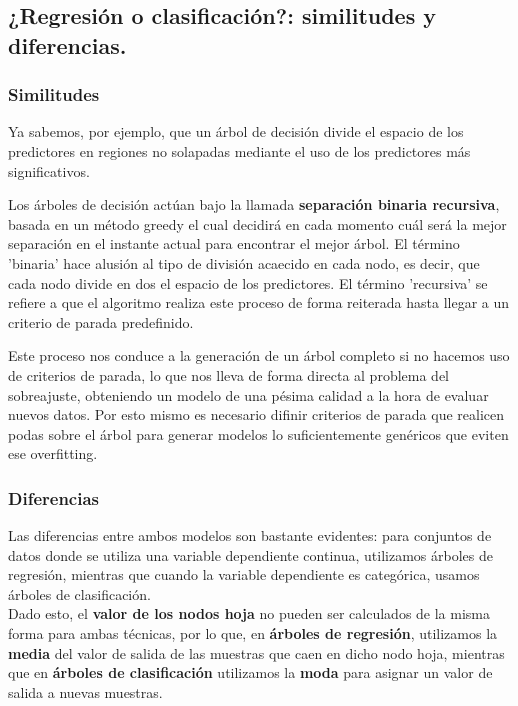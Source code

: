 \subsection{¿Regresión o clasificación?: similitudes y diferencias.}

\subsubsection{Similitudes}

Ya sabemos, por ejemplo, que un árbol de decisión divide el espacio de los predictores en regiones no solapadas mediante el uso de los predictores más significativos.

Los árboles de decisión actúan bajo la llamada \textbf{separación binaria recursiva}, basada en un método greedy el cual decidirá en cada momento cuál será la mejor separación en el instante actual para encontrar el mejor árbol. El término 'binaria' hace alusión al tipo de división acaecido en cada nodo, es decir, que cada nodo divide en dos el espacio de los predictores. El término 'recursiva' se refiere a que el algoritmo realiza este proceso de forma reiterada hasta llegar a un criterio de parada predefinido.

Este proceso nos conduce a la generación de un árbol completo si no hacemos uso de criterios de parada, lo que nos lleva de forma directa al problema del sobreajuste, obteniendo un modelo de una pésima calidad a la hora de evaluar nuevos datos. Por esto mismo es necesario difinir criterios de parada que realicen podas sobre el árbol para generar modelos lo suficientemente genéricos que eviten ese overfitting.

\subsubsection{Diferencias}

Las diferencias entre ambos modelos son bastante evidentes: para conjuntos de datos donde se utiliza una variable dependiente continua, utilizamos árboles de regresión, mientras que cuando la variable dependiente es categórica, usamos árboles de clasificación.\\
Dado esto, el \textbf{valor de los nodos hoja} no pueden ser calculados de la misma forma para ambas técnicas, por lo que, en \textbf{árboles de regresión}, utilizamos la \textbf{media} del valor de salida de las muestras que caen en dicho nodo hoja, mientras que en \textbf{árboles de clasificación} utilizamos la \textbf{moda} para asignar un valor de salida a nuevas muestras.

